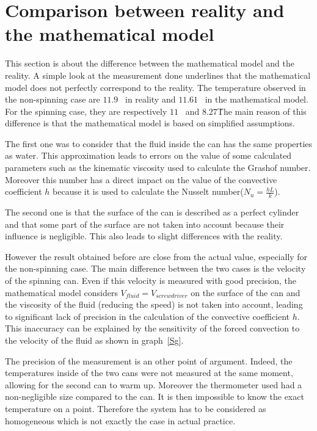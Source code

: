 \documentclass{report}
\begin{document}
	\chapter[Reality and mathematical model]{Comparison between reality and the mathematical model}\label{rvmm}
	
	This section is about the difference between the mathematical model and the reality. A simple look at the measurement done underlines that the mathematical model does not perfectly correspond to the reality. The temperature observed in the non-spinning case are $11.9$ \textcelsius\ in reality and $11.61$ \textcelsius\ in the mathematical model. For the spinning case, they are respectively $11$ \textcelsius\  and $8.27$\textcelsius\.
	The main reason of this difference is that the mathematical model is based on simplified assumptions.
	
	The first one was to consider that the fluid inside	the can has the same properties as water. This approximation leads to errors on the value of some calculated parameters such as the kinematic viscosity	used to calculate the Grashof number. Moreover this number has a direct impact on the value of the convective coefficient $h$ because it is used to calculate the Nusselt number($N_{u}=\frac{hL}{k}$). 
	
	The second one is that the surface of the can is described as a perfect cylinder and that some part of the surface are not taken into account because their influence is negligible. This also leads to slight differences with the reality.
	
	However the result obtained before are close from the actual value, especially for the non-spinning case. The main difference	between the two cases is the velocity of the spinning can. Even if this velocity is measured with good precision, the mathematical model considers $V_{fluid}=V_{screwdriver}$ on the surface of the can and the viscosity of the fluid (reducing the speed) is not taken into account, leading to significant lack of precision in the calculation of the convective coefficient $h$. This inaccuracy can be explained by the sensitivity of the forced convection to the velocity of the fluid as shown in graph~\ref{Sg}.
	
	
	The precision of the measurement is an other point of argument. Indeed, the temperatures inside of the two cans were not measured at the same moment, allowing for the second can to warm up. Moreover the thermometer used had a non-negligible size compared to the can. It is then impossible to know the exact temperature on a point.
	Therefore the system has to be considered as homogeneous which is not exactly the case in actual practice.
	
\end{document}
